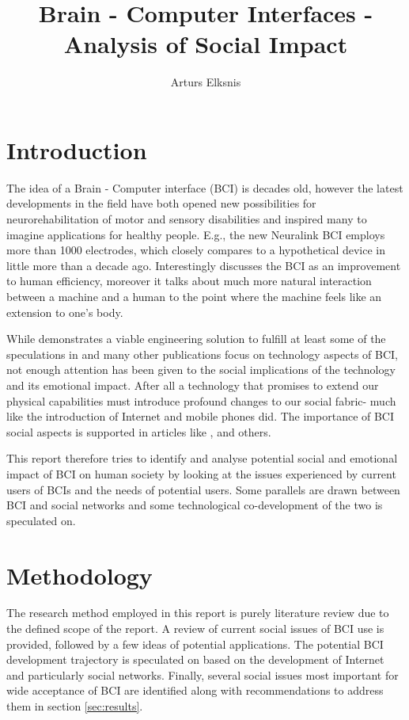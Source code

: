 \documentclass[fleqn,11pt]{olplainarticle}
\title{Brain - Computer Interfaces - Analysis of Social Impact}
\author[1]{Arturs Elksnis}
\begin{document}
\flushbottom
\maketitle
\thispagestyle{empty}

\section{Introduction}
The idea of a Brain - Computer interface (BCI) is decades old, however the latest developments in the field have both opened new possibilities for neurorehabilitation of motor and sensory disabilities and inspired many to imagine applications for healthy people. E.g., the new Neuralink BCI \cite{musk2019integrated} employs more than 1000 electrodes, which closely compares to a hypothetical device in \cite{schalk2008brain} little more than a decade ago. Interestingly \cite{schalk2008brain} discusses the BCI as an improvement to human efficiency, moreover it talks about much more natural interaction between a machine and a human to the point where the machine feels like an extension to one's body.

While \cite{musk2019integrated} demonstrates a viable engineering solution to fulfill at least some of the speculations in \cite{schalk2008brain} and many other publications focus on technology aspects of BCI, not enough attention has been given to the social implications of the technology and its emotional impact. After all a technology that promises to extend our physical capabilities must introduce profound changes to our social fabric- much like the introduction of Internet and mobile phones did. The importance of BCI social aspects is supported in articles like \cite{sexton2015overlooked}, \cite{kogel2019using} and others.

This report therefore tries to identify and analyse potential social and emotional impact of BCI on human society by looking at the issues experienced by current users of BCIs and the needs of potential users. Some parallels are drawn between BCI and social networks and some technological co-development of the two is speculated on.

\section{Methodology}
The research method employed in this report is purely literature review due to the defined scope of the report. A review of current social issues of BCI use is provided, followed by a few ideas of potential applications. The potential BCI development trajectory is speculated on based on the development of Internet and particularly social networks. Finally, several social issues most important for wide acceptance of BCI are identified along with recommendations to address them in section \ref{sec:results}.
\end{document}
